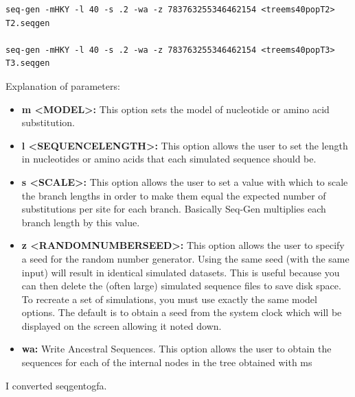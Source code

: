 \begin{itemize}
\begin{verbatim}
seq-gen -mHKY -l 40 -s .2 -wa -z 783763255346462154 <treems40popT2> T2.seqgen

seq-gen -mHKY -l 40 -s .2 -wa -z 783763255346462154 <treems40popT3> T3.seqgen

\end{verbatim}

Explanation of parameters:

\begin{itemize}

\item\textbf{m <MODEL>:} This option sets the model of nucleotide or amino acid substitution.
\item\textbf{l <SEQUENCELENGTH>:} This option allows the user to set the length in nucleotides or amino acids that each simulated sequence should be.
\item\textbf{s <SCALE>:} This option allows the user to set a value with which to scale the branch lengths in order to make them equal the expected number of substitutions per site for each branch. Basically Seq-Gen multiplies each branch length by this value.
\item\textbf{z <RANDOMNUMBERSEED>:} This option allows the user to specify a seed for the random number generator. Using the same seed (with the same input) will result in identical simulated datasets. This is useful because you can then delete the (often large) simulated sequence files to save disk space. To recreate a set of simulations, you must use exactly the same model options. The default is to obtain a seed from the system clock which will be displayed on the screen allowing it noted down.
\item\textbf{wa:}
Write Ancestral Sequences. This option allows the user to obtain the sequences for each of the internal nodes in the tree obtained with ms 
\end{itemize}

I converted seqgentogfa.
\end{itemize}

